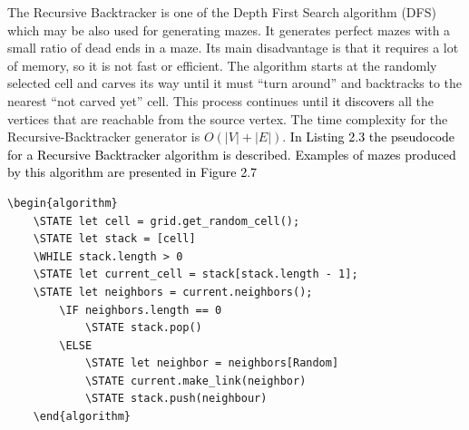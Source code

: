 The Recursive Backtracker is one of the Depth First Search algorithm (DFS) which may be also used for generating mazes. It generates perfect mazes with a small ratio of dead ends in a maze. Its main disadvantage is that it requires a lot of memory, so it is not fast or efficient\cite{18}. The algorithm starts at the randomly selected cell and carves its way until it must “turn around” and backtracks to the nearest “not carved yet” cell. This process continues until \textcolor{black}{it discovers} all the vertices that are reachable from the source vertex. The time complexity for the Recursive-Backtracker generator is $O(|V|+|E|)$. \textcolor{black}{In Listing 2.3 the pseudocode for a Recursive Backtracker algorithm is described. Examples of mazes produced by this algorithm are presented in Figure 2.7}

\begin{lstlisting}[caption={Pseudocode for a Recursive-Backtracker algorithm}]
	\begin{algorithm}
	\STATE let cell = grid.get_random_cell();
	\STATE let stack = [cell]
	\WHILE stack.length > 0
	\STATE let current_cell = stack[stack.length - 1];
	\STATE let neighbors = current.neighbors();
		\IF neighbors.length == 0
			\STATE stack.pop()
		\ELSE 
			\STATE let neighbor = neighbors[Random]
			\STATE current.make_link(neighbor)
			\STATE stack.push(neighbour)	
	\end{algorithm}
	\end{lstlisting}
\newline
